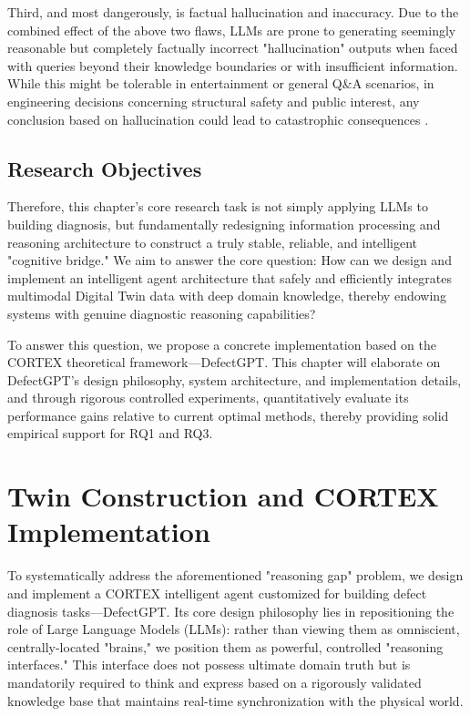 Third, and most dangerously, is factual hallucination and inaccuracy. Due to the combined effect of the above two flaws, LLMs are prone to generating seemingly reasonable but completely factually incorrect "hallucination" outputs when faced with queries beyond their knowledge boundaries or with insufficient information. While this might be tolerable in entertainment or general Q\&A scenarios, in engineering decisions concerning structural safety and public interest, any conclusion based on hallucination could lead to catastrophic consequences \cite{zhang2023siren}.

\subsection{Research Objectives}

Therefore, this chapter's core research task is not simply applying LLMs to building diagnosis, but fundamentally redesigning information processing and reasoning architecture to construct a truly stable, reliable, and intelligent "cognitive bridge." We aim to answer the core question: How can we design and implement an intelligent agent architecture that safely and efficiently integrates multimodal Digital Twin data with deep domain knowledge, thereby endowing systems with genuine diagnostic reasoning capabilities?

To answer this question, we propose a concrete implementation based on the CORTEX theoretical framework—DefectGPT. This chapter will elaborate on DefectGPT's design philosophy, system architecture, and implementation details, and through rigorous controlled experiments, quantitatively evaluate its performance gains relative to current optimal methods, thereby providing solid empirical support for RQ1 and RQ3.

\section{Twin Construction and CORTEX Implementation}

To systematically address the aforementioned "reasoning gap" problem, we design and implement a CORTEX intelligent agent customized for building defect diagnosis tasks—DefectGPT. Its core design philosophy lies in repositioning the role of Large Language Models (LLMs): rather than viewing them as omniscient, centrally-located "brains," we position them as powerful, controlled "reasoning interfaces." This interface does not possess ultimate domain truth but is mandatorily required to think and express based on a rigorously validated knowledge base that maintains real-time synchronization with the physical world.

